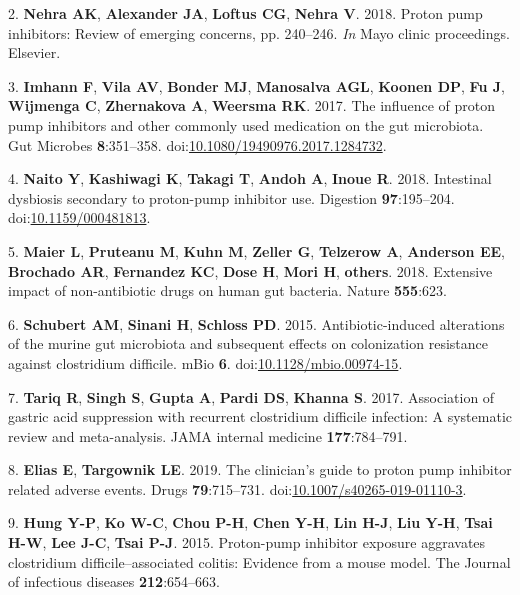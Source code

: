 \documentclass[11pt,]{article}
\begin{document}
\hypertarget{ref-nehra2018proton}{}
2. \textbf{Nehra AK}, \textbf{Alexander JA}, \textbf{Loftus CG},
\textbf{Nehra V}. 2018. Proton pump inhibitors: Review of emerging
concerns, pp. 240--246. \emph{In} Mayo clinic proceedings. Elsevier.

\hypertarget{ref-Imhann2017}{}
3. \textbf{Imhann F}, \textbf{Vila AV}, \textbf{Bonder MJ},
\textbf{Manosalva AGL}, \textbf{Koonen DP}, \textbf{Fu J},
\textbf{Wijmenga C}, \textbf{Zhernakova A}, \textbf{Weersma RK}. 2017.
The influence of proton pump inhibitors and other commonly used
medication on the gut microbiota. Gut Microbes \textbf{8}:351--358.
doi:\href{https://doi.org/10.1080/19490976.2017.1284732}{10.1080/19490976.2017.1284732}.

\hypertarget{ref-Naito2018}{}
4. \textbf{Naito Y}, \textbf{Kashiwagi K}, \textbf{Takagi T},
\textbf{Andoh A}, \textbf{Inoue R}. 2018. Intestinal dysbiosis secondary
to proton-pump inhibitor use. Digestion \textbf{97}:195--204.
doi:\href{https://doi.org/10.1159/000481813}{10.1159/000481813}.

\hypertarget{ref-maier2018extensive}{}
5. \textbf{Maier L}, \textbf{Pruteanu M}, \textbf{Kuhn M},
\textbf{Zeller G}, \textbf{Telzerow A}, \textbf{Anderson EE},
\textbf{Brochado AR}, \textbf{Fernandez KC}, \textbf{Dose H},
\textbf{Mori H}, \textbf{others}. 2018. Extensive impact of
non-antibiotic drugs on human gut bacteria. Nature \textbf{555}:623.

\hypertarget{ref-Schubert2015}{}
6. \textbf{Schubert AM}, \textbf{Sinani H}, \textbf{Schloss PD}. 2015.
Antibiotic-induced alterations of the murine gut microbiota and
subsequent effects on colonization resistance against clostridium
difficile. mBio \textbf{6}.
doi:\href{https://doi.org/10.1128/mbio.00974-15}{10.1128/mbio.00974-15}.

\hypertarget{ref-tariq2017association}{}
7. \textbf{Tariq R}, \textbf{Singh S}, \textbf{Gupta A}, \textbf{Pardi
DS}, \textbf{Khanna S}. 2017. Association of gastric acid suppression
with recurrent clostridium difficile infection: A systematic review and
meta-analysis. JAMA internal medicine \textbf{177}:784--791.

\hypertarget{ref-Elias2019}{}
8. \textbf{Elias E}, \textbf{Targownik LE}. 2019. The clinician's guide
to proton pump inhibitor related adverse events. Drugs
\textbf{79}:715--731.
doi:\href{https://doi.org/10.1007/s40265-019-01110-3}{10.1007/s40265-019-01110-3}.

\hypertarget{ref-hung2015proton}{}
9. \textbf{Hung Y-P}, \textbf{Ko W-C}, \textbf{Chou P-H}, \textbf{Chen
Y-H}, \textbf{Lin H-J}, \textbf{Liu Y-H}, \textbf{Tsai H-W}, \textbf{Lee
J-C}, \textbf{Tsai P-J}. 2015. Proton-pump inhibitor exposure aggravates
clostridium difficile--associated colitis: Evidence from a mouse model.
The Journal of infectious diseases \textbf{212}:654--663.
\end{document}
